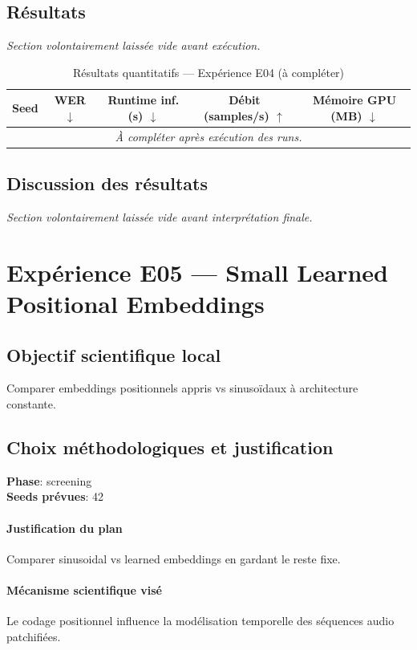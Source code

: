 \documentclass[11pt,a4paper]{article}
\begin{document}
\subsection{Résultats}
\textit{Section volontairement laissée vide avant exécution.}

\begin{table}[H]
\centering
\caption{Résultats quantitatifs --- Expérience E04 (à compléter)}
\begin{tabular}{lcccc}
\toprule
Seed & WER $\downarrow$ & Runtime inf. (s) $\downarrow$ & Débit (samples/s) $\uparrow$ & Mémoire GPU (MB) $\downarrow$ \\
\midrule
\multicolumn{5}{c}{\textit{À compléter après exécution des runs.}} \\
\bottomrule
\end{tabular}
\end{table}

\subsection{Discussion des résultats}
\textit{Section volontairement laissée vide avant interprétation finale.}


\section{Expérience E05 --- Small Learned Positional Embeddings}
\subsection{Objectif scientifique local}
Comparer embeddings positionnels appris vs sinusoïdaux à architecture constante.

\subsection{Choix méthodologiques et justification}
\textbf{Phase}: screening\\
\textbf{Seeds prévues}: 42\\


\paragraph{Justification du plan}
Comparer sinusoidal vs learned embeddings en gardant le reste fixe.

\paragraph{Mécanisme scientifique visé}
Le codage positionnel influence la modélisation temporelle des séquences audio patchifiées.
\end{document}
